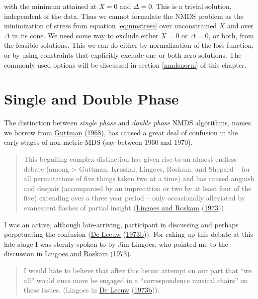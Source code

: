 \documentclass[
  12pt,
]{book}
\theoremstyle{definition}
\theoremstyle{definition}
\theoremstyle{definition}
\theoremstyle{definition}
\theoremstyle{remark}
\begin{document}
with the minimum attained at \(X=0\) and \(\Delta=0\). This is a trivial solution, independent of the data. Thus we cannot formulate the
NMDS problem as the minimization of stress from equation \eqref{eq:nmstress} over
unconstrained \(X\) and over \(\Delta\) in its cone. We need some way to exclude
either \(X=0\) or \(\Delta=0\), or both, from the feasible solutions. This we can do either by normalization of the loss function, or by using constraints that explicitly
exclude one or both zero solutions. The commonly used options will be discussed in section \ref{nmdsnorm} of this chapter.

\hypertarget{nmssingledouble}{%
\section{Single and Double Phase}\label{nmssingledouble}}

The distinction between \emph{single phase} and \emph{double phase} NMDS algorithms, names we borrow from \protect\hyperlink{ref-guttman_68}{Guttman} (\protect\hyperlink{ref-guttman_68}{1968}), has caused a great deal of confusion in the early stages of non-metric MDS (say between 1960 and 1970).

\begin{quote}
This beguiling complex distinction has given rise to an almost endless debate (among \textgreater{} Guttman, Kruskal, Lingoes, Roskam, and Shepard -- for all permutations of five
things taken two at a time) and has caused anguish and despair (accompanied by
an imprecation or two by at least four of the five) extending over a three year
period -- only occasionally alleviated by evanescent flashes of partial insight
(\protect\hyperlink{ref-lingoes_roskam_73}{Lingoes and Roskam} (\protect\hyperlink{ref-lingoes_roskam_73}{1973}))
\end{quote}

I was an active, although late-arriving, participant in discussing and perhaps perpetuating the confusion (\protect\hyperlink{ref-deleeuw_R_73g}{De Leeuw} (\protect\hyperlink{ref-deleeuw_R_73g}{1973b})). For raking up this debate
at this late stage I was sternly spoken to by Jim Lingoes, who pointed me to the
discussion in \protect\hyperlink{ref-lingoes_roskam_73}{Lingoes and Roskam} (\protect\hyperlink{ref-lingoes_roskam_73}{1973}).

\begin{quote}
I would hate to believe that after this heroic attempt on our part that ``we all''
would once more be engaged in a ``correspondence musical chairs'' on these issues.
(Lingoes in \protect\hyperlink{ref-deleeuw_R_73g}{De Leeuw} (\protect\hyperlink{ref-deleeuw_R_73g}{1973b})).
\end{quote}
\end{document}
